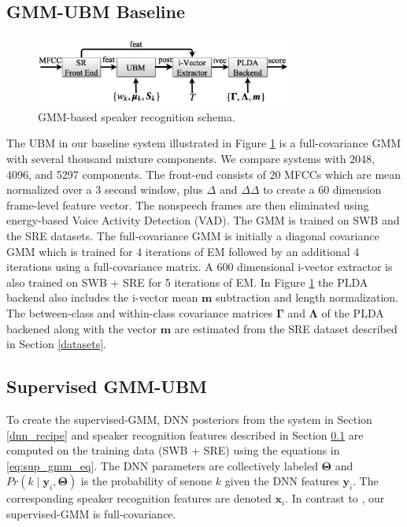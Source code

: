 \documentclass{article}
\begin{document}
\subsection{GMM-UBM Baseline}
\label{gmm_sys}

\begin{figure}[th]
\centerline{\includegraphics[width=8.5cm]{fig/baseline_schema}}
\caption{GMM-based speaker recognition schema.}
\label{fig:gmm_schema}
\end{figure}

The UBM in our baseline system illustrated in Figure \ref{fig:gmm_schema} 
is a full-covariance
GMM with several thousand mixture components. We compare systems with
2048, 4096, and 5297 components. The front-end consists of 20 MFCCs which
are mean normalized over a 3 second window, plus $\Delta$ 
and $\Delta \Delta$ to create a 60 dimension frame-level feature vector.
The nonspeech frames are then eliminated using
energy-based Voice Activity Detection (VAD). The GMM is trained on SWB
and the SRE datasets. The 
full-covariance GMM is initially a diagonal
covariance GMM which is trained for 4 iterations of EM followed by
an additional 4 iterations using a full-covariance matrix.
 A 600 dimensional i-vector extractor is also trained on 
SWB + SRE for 5 iterations of EM. In Figure \ref{fig:gmm_schema} the PLDA
backend also includes the i-vector mean $\boldsymbol{m}$ subtraction and
length normalization. The between-class and within-class
covariance matrices $\boldsymbol{\Gamma}$ and $\boldsymbol{\Lambda}$ of the PLDA backened along with
the vector $\boldsymbol{m}$ are estimated from the SRE dataset described 
in Section \ref{datasets}.

\subsection{Supervised GMM-UBM}
\label{sup_gmm_sys}

To create the supervised-GMM, DNN posteriors from the system in Section \ref{dnn_recipe}
and speaker recognition
features described in Section \ref{gmm_sys} are computed on the training data (SWB + SRE)
 using the
equations in \ref{eq:sup_gmm_eq}. The DNN parameters are collectively
labeled $\boldsymbol{\Theta}$ and 
$Pr(k \mid \boldsymbol{y}_{i}, \boldsymbol{\Theta})$ is the
probability of senone $k$ given the DNN features $\boldsymbol{y}_{i}$. The
corresponding speaker recognition features are denoted $\boldsymbol{x}_{i}$.
In contrast to \cite{lei2014}, our supervised-GMM is full-covariance.
\end{document}
